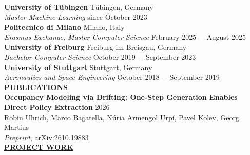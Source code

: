 \documentclass{article}
\begin{document}
\noindent\textbf{University of Tübingen} \hfill Tübingen, Germany  \\
\textit{Master Machine Learning} \hfill since October 2023
\vspace{0.3cm}\\
\noindent\textbf{Politecnico di Milano} \hfill Milano, Italy  \\
\textit{Erasmus Exchange, Master Computer Science} \hfill February 2025 $-$ August 2025
\vspace{0.3cm}\\
\textbf{University of Freiburg} \hfill Freiburg im Breisgau, Germany  \\
\textit{Bachelor Computer Science} \hfill October 2019 $-$ September 2023
\vspace{0.3cm}\\
\textbf{University of Stuttgart} \hfill Stuttgart, Germany \\
\textit{Aeronautics and Space Engineering} \hfill October 2018 $-$ September 2019 
\vspace{0.2cm}\\


\noindent \textbf{\underline{PUBLICATIONS}} \\

\noindent \textbf{Occupancy Modeling via Drifting: One-Step Generation Enables Direct Policy Extraction} \hfill 2026 \\
\underline{Robin Uhrich}, Marco Bagatella, Núria Armengol Urpí, Pavel Kolev, Georg Martius \\
\textit{Preprint}, \href{https://arxiv.org/abs/2610.19883}{arXiv:2610.19883}
\vspace{0.4cm}\\

%
%
\noindent \textbf{\underline{PROJECT WORK}} \\
\end{document}
